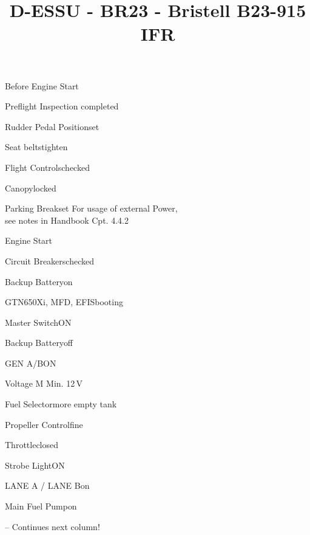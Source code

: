 \def\papersize{5}




\title{D-ESSU  -  BR23  -  Bristell B23-915 IFR}

\begin{checklist}{Before Engine Start}
  \item{Preflight Inspection  }{completed}
  \item{Rudder Pedal Position}{set}
  \item{Seat belts}{tighten}
  \item{Flight Controls}{checked}
  \item{Canopy}{locked}
  \item{Parking Break}{set}
For usage of external Power,\\see notes in Handbook Cpt. 4.4.2
\end{checklist}

\begin{checklist}{Engine Start}
  \item{Circuit Breakers}{checked}
  \item{Backup Battery}{on}
  \item{GTN650Xi, MFD, EFIS}{booting}
  \item{Master Switch}{ON}
  \item{Backup Battery}{off}
  \item{GEN A/B}{ON}
  \item{Voltage M }{Min. 12\,V}
  \item{Fuel Selector}{more empty tank}
  \item{Propeller Control}{fine}
  \item{Throttle}{closed}
  \item{Strobe Light}{ON}
  \item{LANE A / LANE B}{on}
  \item{Main Fuel Pump}{on} 

-- Continues next column!
\end{checklist}

